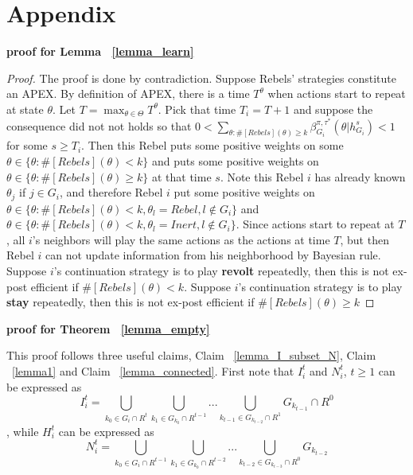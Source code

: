 \documentclass[12pt,letter]{article}
\theoremstyle{definition}
\theoremstyle{remark}
\theoremstyle{claim}
\begin{document}


\appendix
\section{Appendix}

\noindent\textbf{proof for Lemma ~\ref{lemma_learn}}

\begin{proof}
The proof is done by contradiction. Suppose Rebels' strategies constitute an APEX. By definition of APEX, there is a time $T^{\theta}$ when actions start to repeat at state $\theta$. Let $T=\max_{\theta\in \Theta}{T^{\theta}}$. Pick that time $T_i=T+1$ and suppose the consequence did not not holds so that $0<\sum_{\theta:\#[Rebels](\theta)\geq k}\beta^{\pi,\tau^*}_{G_i}(\theta|h^{s}_{G_i})<1$ for some $s\geq T_i$. Then this Rebel puts some positive weights on some $\theta\in \{\theta:\#[Rebels](\theta)< k\}$ and puts some positive weights on $\theta\in \{\theta:\#[Rebels](\theta)\geq k\}$ at that time $s$. Note this Rebel $i$ has already known $\theta_j$ if $j\in G_i$, and therefore Rebel $i$ put some positive weights on $\theta\in \{\theta:\#[Rebels](\theta)< k, \theta_l=Rebel, l\notin G_i\}$ and $\theta\in \{\theta:\#[Rebels](\theta)< k, \theta_l=Inert, l\notin G_i\}$. Since actions start to repeat at $T$, all $i$'s neighbors will play the same actions as the actions at time $T$, but then Rebel $i$ can not update information from his neighborhood by Bayesian rule. Suppose $i$'s continuation strategy is to play \textbf{revolt} repeatedly, then this is not ex-post efficient if $\#[Rebels](\theta)< k$. Suppose $i$'s continuation strategy is to play \textbf{stay} repeatedly, then this is not ex-post efficient if $\#[Rebels](\theta)\geq k$
\end{proof}

\bigskip
\noindent\textbf{proof for Theorem ~\ref{lemma_empty}}

This proof follows three useful claims, Claim ~\ref{lemma_I_subset_N}, Claim ~\ref{lemma1} and Claim ~\ref{lemma_connected}. First note that $I^t_i$ and $N^t_i$, $t\geq 1$ can be expressed as 
\begin{equation}
\label{eq_info_nb}
I^{t}_i = \bigcup_{k_0\in G_i\cap R^{t}}\bigcup_{k_1\in G_{k_0}\cap R^{t-1}}...\bigcup_{k_{t-1}\in G_{k_{t-2}}\cap R^{1}}G_{k_{t-1}}\cap R^0
\end{equation}
, while $H^t_i$ can be expressed as
\begin{equation}
\label{eq_nb}
N^t_i = \bigcup_{k_0\in G_i\cap R^{t-1}}\bigcup_{k_1\in G_{k_0}\cap R^{t-2}}...\bigcup_{k_{t-2}\in G_{k_{t-3}}\cap R^{0}}G_{k_{t-2}}
\end{equation}
\end{document}
